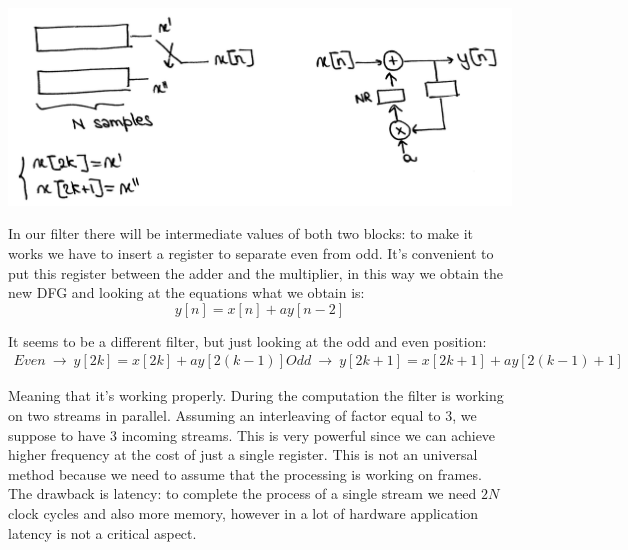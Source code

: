 \begin{center}
  \includegraphics[width=0.7\linewidth]{img/img1/47}
\end{center}

In our filter there will be intermediate values of both two blocks: to make it works we have to insert a register to separate even from odd. It's convenient to put this register between the adder and the multiplier, in this way we obtain the new DFG and looking at the equations what we obtain is:
$$y[n]=x[n]+ay[n-2]$$

It seems to be a different filter, but just looking at the odd and even position:
\begin{eqnarray}
Even \ \rightarrow \ y[2k]=x[2k]+ay[2(k-1)]
Odd \ \rightarrow \ y[2k+1]=x[2k+1]+ay[2(k-1)+1]
\end{eqnarray}

Meaning that it's working properly. During the computation the filter is working on two streams in parallel. Assuming an interleaving of factor equal to 3, we suppose to have 3 incoming streams. This is very powerful since we can achieve higher frequency at the cost of just a single register. This is not an universal method because we need to assume that the processing is working on frames.\\

The drawback is latency: to complete the process of a single stream we need $2N$ clock cycles and also more memory, however in a lot of hardware application latency is not a critical aspect.
